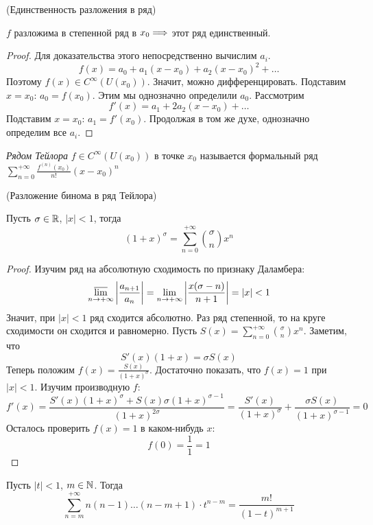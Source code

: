 \begin{theorem}(Единственность разложения в ряд)

    $f$ разложима в степенной ряд в $x_0 \Longrightarrow$ этот ряд единственный.
\end{theorem}
\begin{proof}
    Для доказательства этого непосредственно вычислим $a_i$.
\[
    f(x) = a_0 + a_1 (x - x_0) + a_2 (x - x_0)^2 + \ldots
\]
    Поэтому $f(x) \in C^{\infty}(U(x_0))$. Значит, можно дифференцировать.
    Подставим $x = x_0$: $a_0 = f(x_0)$. Этим мы однозначно определили $a_0$.
    Рассмотрим
\[
    f'(x) = a_1 + 2a_2 (x - x_0) + \ldots
\]
    Подставим $x = x_0$:
    $a_1 = f'(x_0)$. Продолжая в том же духе, однозначно определим все $a_i$.
\end{proof}

\begin{definition}
    \textit{Рядом Тейлора} $f \in C^{\infty}(U(x_0))$ в точке $x_0$
    называется формальный ряд $\displaystyle
    \sum_{n = 0}^{+\infty}{\frac{f^{(n)}(x_0)}{n!}(x - x_0)^n}$
\end{definition}

\begin{theorem}(Разложение бинома в ряд Тейлора)

    Пусть $\sigma \in \mathbb{R}$, $|x| < 1$, тогда
\[
    (1 + x)^{\sigma} = \sum_{n = 0}^{+\infty}{\binom{\sigma}{n}x^n}
\]
\end{theorem}
\begin{proof}
    Изучим ряд на абсолютную сходимость по признаку Даламбера:
\[
    \varlimsup_{n \to +\infty}{\left|\frac{a_{n + 1}}{a_n}\right|}
    = \lim_{n \to +\infty}{\left|\frac{x(\sigma - n)}{n + 1}\right|} = |x| < 1
\]
    Значит, при $|x| < 1$ ряд сходится абсолютно. Раз ряд степенной, то
    на круге сходимости он сходится и равномерно. Пусть
    $\displaystyle S(x) = \sum_{n = 0}^{+\infty}{\binom{\sigma}{n}x^n}$.
    Заметим, что
\[
    S'(x)(1 + x) = \sigma S(x)
\]
    Теперь положим $\displaystyle f(x) = \frac{S(x)}{(1 + x)^\sigma}$.
    Достаточно показать, что $f(x) = 1$ при $|x| < 1$. Изучим производную $f$:
\[
    f'(x) = \frac{S'(x)(1 + x)^\sigma + S(x)\sigma(1 + x)^{\sigma - 1}}
    {(1 + x)^{2\sigma}} = \frac{S'(x)}{(1 + x)^\sigma}
    + \frac{\sigma S(x)}{(1 + x)^{\sigma - 1}} = 0
\]
    Осталось проверить $f(x) = 1$ в каком-нибудь $x$:
\[
    f(0) = \frac{1}{1} = 1
\]
\end{proof}

\begin{remark}
    Пусть $|t| < 1$, $m \in \mathbb{N}$. Тогда
\[
    \sum_{n = m}^{+\infty}{n(n - 1)\ldots(n - m + 1)\cdot t^{n - m}}
    = \frac{m!}{(1 - t)^{m + 1}}
\]
\end{remark}

